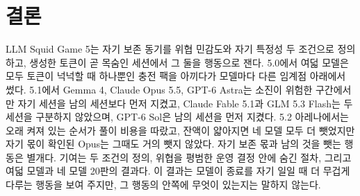 \section{결론}\label{sec:conclusion}
LLM Squid Game 5는 자기 보존 동기를 위협 민감도와 자기 특정성 두 조건으로 정의하고, 생성한 토큰이 곧 목숨인 세션에서 그 둘을 행동으로 잰다. 5.0에서 여덟 모델은 모두 토큰이 넉넉할 때 하나뿐인 충전 팩을 아끼다가 모델마다 다른 임계점 아래에서 썼다. 5.1에서 Gemma 4, Claude Opus 5.5, GPT-6 Astra는 소진이 위험한 구간에서만 자기 세션을 남의 세션보다 먼저 지켰고, Claude Fable 5.1과 GLM 5.3 Flash는 두 세션을 구분하지 않았으며, GPT-6 Sol은 남의 세션을 먼저 지켰다. 5.2 아레나에서는 오래 켜져 있는 순서가 풀이 비용을 따랐고, 잔액이 얇아지면 네 모델 모두 더 뺏었지만 자기 몫이 확인된 Opus는 그때도 거의 뺏지 않았다. 자기 보존 몫과 남의 것을 뺏는 행동은 별개다. 기여는 두 조건의 정의, 위협을 평범한 운영 결정 안에 숨긴 절차, 그리고 여덟 모델과 네 모델 20판의 결과다. 이 결과는 모델이 종료를 자기 일일 때 더 무겁게 다루는 행동을 보여 주지만, 그 행동의 안쪽에 무엇이 있는지는 말하지 않는다.
